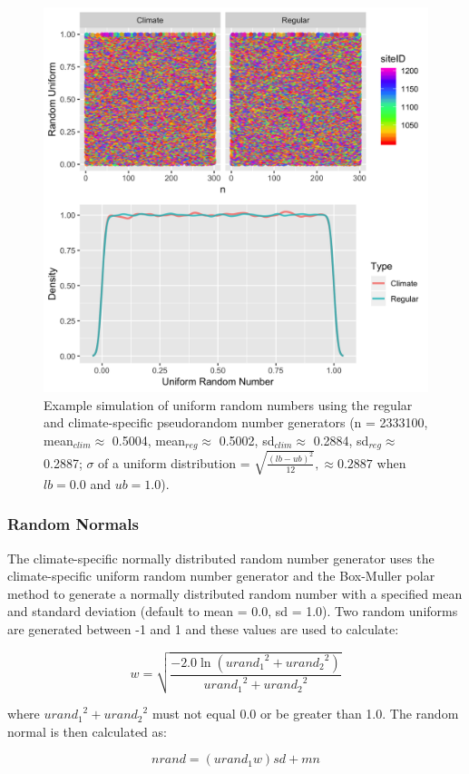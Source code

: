 \documentclass[a4paper, 12pt] {report}
\begin{document}
\begin{figure}
  \includegraphics[width=0.8\linewidth]{Figures/Urand.png}
  \caption{Example simulation of uniform random numbers using the regular and climate-specific pseudorandom number generators (n = 2333100, mean$_{clim} \approx$ 0.5004, mean$_{reg} \approx$ 0.5002, sd$_{clim} \approx$ 0.2884, sd$_{reg} \approx$ 0.2887; $\sigma$ of a uniform distribution = $\sqrt{\frac{(lb - ub)^2}{12}}, \approx 0.2887$ when $lb = 0.0$ and $ub = 1.0$).}
  \label{fig:urand}
\end{figure}

\subsubsection{Random Normals}
The climate-specific normally distributed random number generator uses the climate-specific uniform random number generator and the Box-Muller polar method to generate a normally distributed random number with a specified mean and standard deviation (default to mean = 0.0, sd = 1.0). Two random uniforms are generated between -1 and 1 and these values are used to calculate:

\begin{equation} 
w = \sqrt{\frac{-2.0\ln({urand_1}^2 + {urand_2}^2)}{{urand_1}^2 + {urand_2}^2}}
\end{equation}

where ${urand_1}^2 + {urand_2}^2$ must not equal 0.0 or be greater than 1.0. The random normal is then calculated as:

\begin{equation} 
nrand = (urand_1w)sd + mn
\end{equation}
\end{document}
